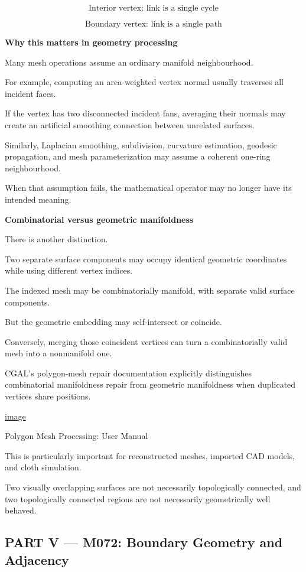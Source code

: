 \[
\boxed{ \text{Interior vertex: link is a single cycle} }
\]

\[
\boxed{ \text{Boundary vertex: link is a single path} }
\]

\textbf{Why this matters in geometry processing}

Many mesh operations assume an ordinary manifold neighbourhood.

For example, computing an area-weighted vertex normal usually traverses all incident faces.

If the vertex has two disconnected incident fans, averaging their normals may create an artificial smoothing connection between unrelated surfaces.

Similarly, Laplacian smoothing, subdivision, curvature estimation, geodesic propagation, and mesh parameterization may assume a coherent one-ring neighbourhood.

When that assumption fails, the mathematical operator may no longer have its intended meaning.

\textbf{Combinatorial versus geometric manifoldness}

There is another distinction.

Two separate surface components may occupy identical geometric coordinates while using different vertex indices.

The indexed mesh may be combinatorially manifold, with separate valid surface components.

But the geometric embedding may self-intersect or coincide.

Conversely, merging those coincident vertices can turn a combinatorially valid mesh into a nonmanifold one.

CGAL's polygon-mesh repair documentation explicitly distinguishes combinatorial manifoldness repair from geometric manifoldness when duplicated vertices share positions. 

\href{https://www.google.com/s2/favicons?domain=https://doc.cgal.org&sz=32}{image}

Polygon Mesh Processing: User Manual

This is particularly important for reconstructed meshes, imported CAD models, and cloth simulation.

Two visually overlapping surfaces are not necessarily topologically connected, and two topologically connected regions are not necessarily geometrically well behaved.

\subsection{PART V --- M072: Boundary Geometry and Adjacency}\label{04-visual-computing-ii-ch023-part-v-m072-boundary-geometry-and-adjacency}

